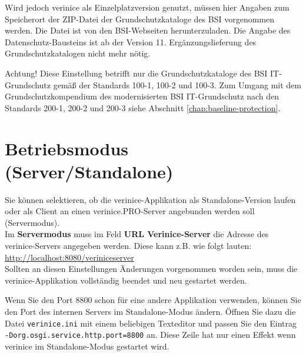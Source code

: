\documentclass[a4paper,10pt]{book}
\begin{document}
Wird jedoch verinice als Einzelplatzversion genutzt, müssen hier Angaben zum
Speicherort der ZIP-Datei der Grundschutzkataloge des BSI vorgenommen werden.
Die Datei ist von den BSI-Webseiten herunterzuladen. Die Angabe des
Datenschutz-Bausteins ist ab der Version 11. Ergänzungslieferung des
Grundschutzkatalogen nicht mehr nötig.

Achtung! Diese Einstellung betrifft nur die Grundschutzkataloge des BSI
IT-Grundschutz gemäß der Standards 100-1, 100-2 und 100-3. Zum Umgang mit dem
Grundschutzkompendium des modernisierten BSI IT-Grundschutz nach den Standards
200-1, 200-2 und 200-3 siehe Abschnitt \ref{chap:baseline-protection}.

\section{Betriebsmodus (Server/Standalone)}
\label{sec:betriebsmodus-server-standalone}

Sie können selektieren, ob die verinice-Applikation als Standalone-Version laufen oder als Client an einen verinice.\textsc{PRO}-Server
angebunden werden soll (Servermodus).
\newline\\
Im \textbf{Servermodus} muss im Feld \textbf{URL Verinice-Server} die Adresse des verinice-Servers angegeben werden. Diese kann
z.B. wie folgt lauten: \\ \href{http://localhost:8080/veriniceserver}{http://localhost:8080/veriniceserver}
\newline\\
Sollten an diesen Einstellungen Änderungen vorgenommen worden sein, muss die verinice-Applikation vollständig beendet und neu gestartet werden.

Wenn Sie den Port 8800 schon für eine andere Applikation verwenden,
können Sie den Port des internen Servers im Standalone-Modus
ändern. Öffnen Sie dazu die Datei \texttt{verinice.ini} mit einem
beliebigen Texteditor und passen Sie den Eintrag
\texttt{-Dorg.osgi.service.http.port=8800} an. Diese Zeile hat nur
einen Effekt wenn verinice im Standalone-Modus gestartet wird.
\end{document}
